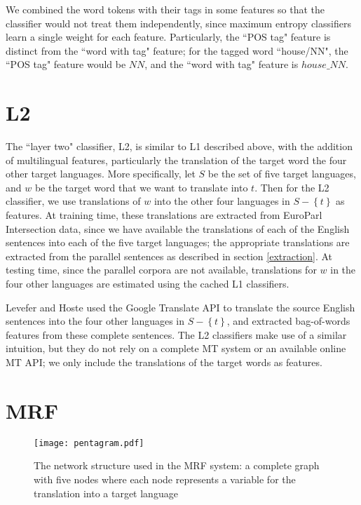 \documentclass[11pt,letterpaper]{article}
\begin{document}
We combined the word tokens with their tags in some features so that the
classifier would not treat them independently, since maximum entropy
classifiers learn a single weight for each feature.
Particularly, the ``POS tag" feature is distinct from the ``word with tag"
feature; for the tagged word ``house/NN", the ``POS tag" feature would be $NN$, and
the ``word with tag" feature is $house\_NN$. 

\section{L2}
The ``layer two" classifier, L2, is similar to L1 described above, with the
addition of multilingual features, particularly the translation of the target
word the four other target languages. More specifically, let $S$ be the set of
five target languages, and $w$ be the target word that we want to translate
into $t$. Then for the L2 classifier, we use translations of $w$ into the other
four languages in $S - \left\lbrace t \right\rbrace$ as features. At training
time, these translations are extracted from EuroParl Intersection data, since
we have available the translations of each of the English sentences into each
of the five target languages; the appropriate translations are extracted from
the parallel sentences as described in section \ref{extraction}. At testing
time, since the parallel corpora are not available, translations for $w$ in the
four other languages are estimated using the cached L1 classifiers.

Levefer and Hoste  used the
Google Translate API to translate the source English sentences into the four
other languages in $S - \left\lbrace t \right\rbrace$, and extracted
bag-of-words features from these complete sentences. The L2 classifiers make
use of a similar intuition, but they do not rely on a complete MT system or an
available online MT API; we only include the translations of the target words
as features.


\section{MRF}
\begin{figure}
  \begin{center}
  \texttt{[image: pentagram.pdf]}
  \end{center}
  \caption{The network structure used in the MRF system: a complete graph with five nodes %
  where each node represents a variable for the translation into a target
language}
  \label{fig:pentagram}
\end{figure}
\end{document}
